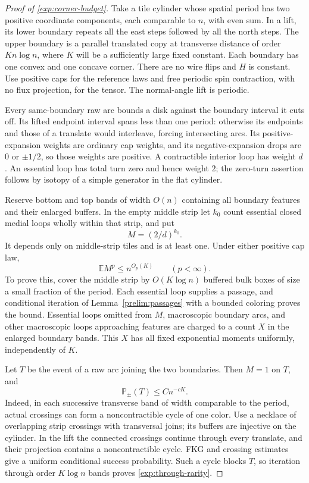 \begin{proof}[Proof of \eqref{exp:corner-budget}]
Take a tile cylinder whose spatial period has two positive coordinate
components, each comparable to $n$, with even sum. In a lift, its lower
boundary repeats all the east steps followed by all the north steps.
The upper boundary is a parallel translated copy at transverse distance
of order $Kn\log n$, where $K$ will be a sufficiently large fixed
constant. Each boundary has one convex and one concave corner. There
are no wire flips and $H$ is constant. Use positive caps for the
reference laws and free periodic spin contraction, with no flux
projection, for the tensor. The normal-angle lift is periodic.

Every same-boundary raw arc bounds a disk against the boundary interval
it cuts off. Its lifted endpoint interval spans less than one period:
otherwise its endpoints and those of a translate would interleave,
forcing intersecting arcs. Its positive-expansion weights are ordinary
cap weights, and its negative-expansion drops are $0$ or $\pm1/2$,
so those weights are positive. A contractible interior loop has weight
$d$. An essential loop has total turn zero and hence weight $2$; the
zero-turn assertion follows by isotopy of a simple generator in the
flat cylinder.

Reserve bottom and top bands of width $O(n)$ containing all boundary
features and their enlarged buffers. In the empty middle strip let
$k_0$ count essential closed medial loops wholly within that strip, and
put
\begin{equation}\label{exp:middle-tilt}
 M=(2/d)^{k_0}.
\end{equation}
It depends only on middle-strip tiles and is at least one. Under either
positive cap law,
\begin{equation}\label{exp:middle-moments}
 \mathbb E M^p\le n^{O_p(K)}\qquad(p<\infty).
\end{equation}
To prove this, cover the middle strip by $O(K\log n)$ buffered bulk
boxes of size a small fraction of the period. Each essential loop
supplies a passage, and conditional iteration of
Lemma~\ref{prelim:passages} with a bounded coloring proves the bound.
Essential loops omitted from $M$, macroscopic boundary arcs, and other
macroscopic loops approaching features are charged to a count $X$ in
the enlarged boundary bands. This $X$ has all fixed exponential moments
uniformly, independently of $K$.

Let $T$ be the event of a raw arc joining the two boundaries. Then
$M=1$ on $T$, and
\begin{equation}\label{exp:through-rarity}
 \mathbb P_\pm(T)\le C n^{-cK}.
\end{equation}
Indeed, in each successive transverse band of width comparable to the
period, actual crossings can form a noncontractible cycle of one color.
Use a necklace of overlapping strip crossings with transversal joins;
its buffers are injective on the cylinder. In the lift the connected
crossings continue through every translate, and their projection
contains a noncontractible cycle. FKG and crossing estimates give a
uniform conditional success probability. Such a cycle blocks $T$, so
iteration through order $K\log n$ bands proves
\eqref{exp:through-rarity}.


\end{proof}
